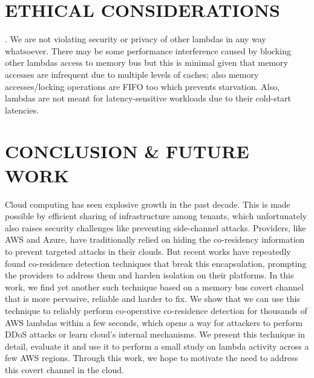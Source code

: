 
\section{ETHICAL CONSIDERATIONS}
. We are not violating security or privacy of other 
lambdas in any way whatsoever. There may be some performance interference caused 
by blocking other lambdas access to memory bus but this is minimal given 
that memory accesses are infrequent due to multiple levels of caches; also memory accesses/locking operations are FIFO too which prevents starvation. Also, lambdas are not meant for latency-sensitive workloads due to their cold-start latencies.

\section{CONCLUSION \& FUTURE WORK}
\label{sec:conclusion}
Cloud computing has seen explosive growth in the past
decade. This is made possible by efficient sharing of
infrastructure among tenants, which unfortunately also raises security challenges like preventing side-channel attacks. Providers, like AWS
and Azure, have traditionally relied on hiding the 
co-residency information to prevent targeted attacks 
in their clouds. But recent works have repeatedly 
found co-residence detection techniques that break
this encapsulation, prompting the providers to address 
them and harden isolation on their platforms. In 
this work, we find yet another such technique based on 
a memory bus covert channel that 
is more pervasive, reliable and harder to fix. We 
show that we can use this technique to reliably perform co-operative co-residence detection for thousands 
of AWS lambdas within a few seconds, which opens a 
way for attackers to perform DDoS attacks or learn 
cloud's internal mechanisms. We present this technique 
in detail, evaluate it and use it to perform a small
study on lambda activity across a few AWS regions. 
Through this work, we hope to motivate the need to 
address this covert channel in the cloud.

